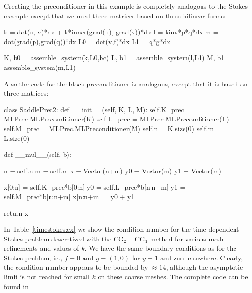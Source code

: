 Creating the preconditioner in this example is completely analogous to the Stokes
example except that we need three matrices based on three bilinear forms: 
\begin{python}
k = dot(u, v)*dx +  k*inner(grad(u), grad(v))*dx 
l = kinv*p*q*dx 
m = dot(grad(p),grad(q))*dx 
L0 = dot(v,f)*dx 
L1 = q*g*dx 

K, b0 = assemble_system(k,L0,bc)
L, b1 = assemble_system(l,L1)
M, b1 = assemble_system(m,L1)
\end{python}
Also the code for the block preconditioner is analogous, except that
it is based on three matrices: 
\begin{python}
class SaddlePrec2: 
    def __init__(self, K, L, M):  
        self.K_prec = MLPrec.MLPreconditioner(K)
        self.L_prec = MLPrec.MLPreconditioner(L)
        self.M_prec = MLPrec.MLPreconditioner(M)
        self.n = K.size(0)
        self.m = L.size(0)

    def __mul__(self, b):

        n = self.n
        m = self.m
        x = Vector(n+m)
        y0 = Vector(m)
        y1 = Vector(m)

        x[0:n]    = self.K_prec*b[0:n]
        y0        = self.L_prec*b[n:n+m] 
        y1        = self.M_prec*b[n:n+m] 
        x[n:n+m]   = y0 + y1  

        return x 
\end{python}
In Table~\ref{timestokes:ex} we show the condition number for the time-dependent Stokes problem descretized
with the $\mathrm{CG}_2-\mathrm{CG}_1$ method for various mesh refinements and values of $k$. We have the 
same boundary conditions as for the Stokes problem, ie., $f=0$ and $g = (1,0)$ for $y=1$ and zero elsewhere. 
Clearly, the condition number appears to be bounded by $\approx 14$,  although the asymptotic limit 
is not reached for small $k$ on these coarse meshes. 
The complete code can be found in 

